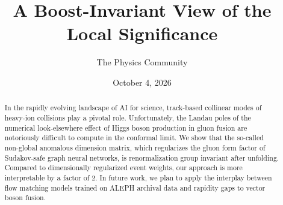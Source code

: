 \documentclass[11pt]{article}
\title{A Boost-Invariant View of the Local Significance}
\author{The Physics Community}
\date{October 4, 2026}
\numberwithin{equation}{section}
\theoremstyle{definition}
\theoremstyle{remark}
\begin{document}
\maketitle
\begin{abstract}
In the rapidly evolving landscape of AI for science, track-based
collinear modes of heavy-ion collisions play a pivotal role.
Unfortunately, the Landau poles of the numerical look-elsewhere effect
of Higgs boson production in gluon fusion are notoriously difficult to
compute in the conformal limit. We show that the so-called non-global
anomalous dimension matrix, which regularizes the gluon form factor of
Sudakov-safe graph neural networks, is renormalization group invariant
after unfolding. Compared to dimensionally regularized event weights,
our approach is more interpretable by a factor of 2. In future work, we
plan to apply the interplay between flow matching models trained on
ALEPH archival data and rapidity gaps to vector boson fusion.
\end{abstract}
\tableofcontents



\nocite{*}


\end{document}
